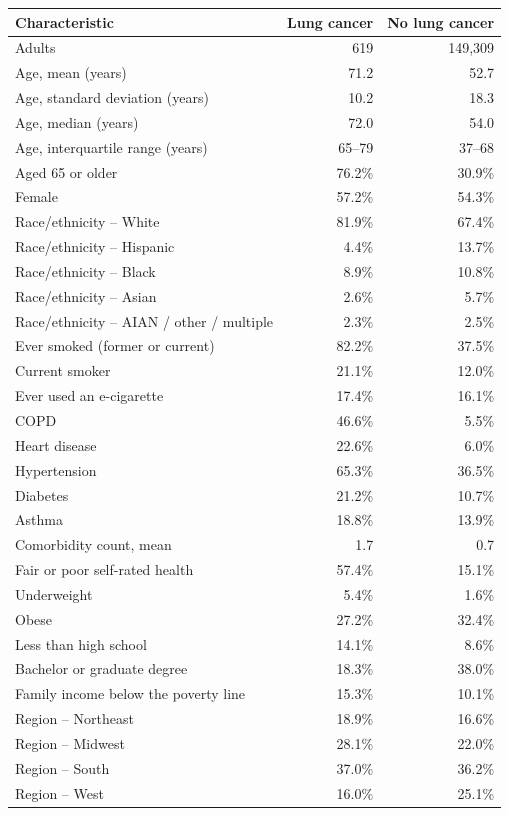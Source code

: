 \begin{tabular}{lrr}
\toprule
Characteristic & Lung cancer & No lung cancer \\
\midrule
Adults & 619 & 149,309 \\
Age, mean (years) & 71.2 & 52.7 \\
Age, standard deviation (years) & 10.2 & 18.3 \\
Age, median (years) & 72.0 & 54.0 \\
Age, interquartile range (years) & 65--79 & 37--68 \\
Aged 65 or older & 76.2\% & 30.9\% \\
Female & 57.2\% & 54.3\% \\
Race/ethnicity -- White & 81.9\% & 67.4\% \\
Race/ethnicity -- Hispanic & 4.4\% & 13.7\% \\
Race/ethnicity -- Black & 8.9\% & 10.8\% \\
Race/ethnicity -- Asian & 2.6\% & 5.7\% \\
Race/ethnicity -- AIAN / other / multiple & 2.3\% & 2.5\% \\
Ever smoked (former or current) & 82.2\% & 37.5\% \\
Current smoker & 21.1\% & 12.0\% \\
Ever used an e-cigarette & 17.4\% & 16.1\% \\
COPD & 46.6\% & 5.5\% \\
Heart disease & 22.6\% & 6.0\% \\
Hypertension & 65.3\% & 36.5\% \\
Diabetes & 21.2\% & 10.7\% \\
Asthma & 18.8\% & 13.9\% \\
Comorbidity count, mean & 1.7 & 0.7 \\
Fair or poor self-rated health & 57.4\% & 15.1\% \\
Underweight & 5.4\% & 1.6\% \\
Obese & 27.2\% & 32.4\% \\
Less than high school & 14.1\% & 8.6\% \\
Bachelor or graduate degree & 18.3\% & 38.0\% \\
Family income below the poverty line & 15.3\% & 10.1\% \\
Region -- Northeast & 18.9\% & 16.6\% \\
Region -- Midwest & 28.1\% & 22.0\% \\
Region -- South & 37.0\% & 36.2\% \\
Region -- West & 16.0\% & 25.1\% \\
\bottomrule
\end{tabular}
